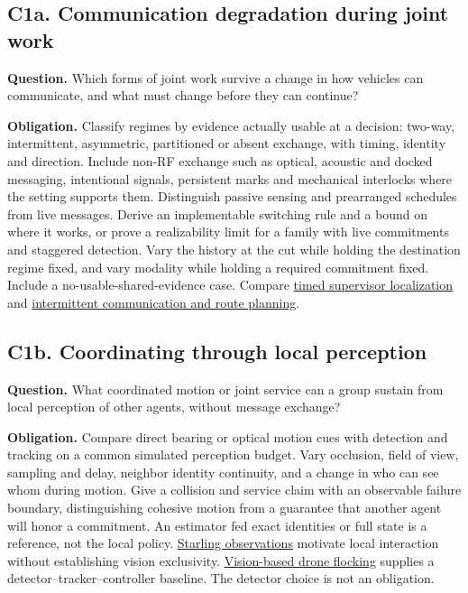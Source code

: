 \documentclass[11pt]{article}
\begin{document}
\subsection{C1a. Communication degradation during joint work}
\textbf{Question.} Which forms of joint work survive a change in how vehicles can communicate, and what must change before they can continue?

\textbf{Obligation.} Classify regimes by evidence actually usable at a decision: two-way, intermittent, asymmetric, partitioned or absent exchange, with timing, identity and direction. Include non-RF exchange such as optical, acoustic and docked messaging, intentional signals, persistent marks and mechanical interlocks where the setting supports them. Distinguish passive sensing and prearranged schedules from live messages. Derive an implementable switching rule and a bound on where it works, or prove a realizability limit for a family with live commitments and staggered detection. Vary the history at the cut while holding the destination regime fixed, and vary modality while holding a required commitment fixed. Include a no-usable-shared-evidence case. Compare \href{https://arxiv.org/abs/1603.02023}{timed supervisor localization} and \href{https://arxiv.org/abs/1609.07038}{intermittent communication and route planning}.

\subsection{C1b. Coordinating through local perception}
\textbf{Question.} What coordinated motion or joint service can a group sustain from local perception of other agents, without message exchange?

\textbf{Obligation.} Compare direct bearing or optical motion cues with detection and tracking on a common simulated perception budget. Vary occlusion, field of view, sampling and delay, neighbor identity continuity, and a change in who can see whom during motion. Give a collision and service claim with an observable failure boundary, distinguishing cohesive motion from a guarantee that another agent will honor a commitment. An estimator fed exact identities or full state is a reference, not the local policy. \href{https://pmc.ncbi.nlm.nih.gov/articles/PMC2234121/}{Starling observations} motivate local interaction without establishing vision exclusivity. \href{https://arxiv.org/abs/2012.01245}{Vision-based drone flocking} supplies a detector--tracker--controller baseline. The detector choice is not an obligation.
\end{document}
